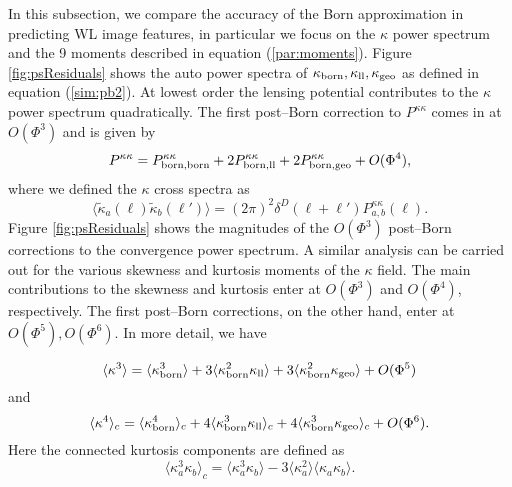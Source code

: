 \documentclass[reprint,aps,prd,superscriptaddress,showkeys,showpacs]{revtex4-1}
\begin{document}
In this subsection, we compare the accuracy of the Born approximation in predicting WL image features, in particular we focus on the $\kappa$ power spectrum and the 9 moments described in equation (\ref{par:moments}). Figure \ref{fig:psResiduals} shows the auto power spectra of $\kappa_{\rm born},\kappa_{\rm ll},\kappa_{\rm geo}$ as defined in equation (\ref{sim:pb2}). At lowest order the lensing potential contributes to the $\kappa$ power spectrum quadratically. The first post--Born correction to $P^{\kappa\kappa}$ comes in at $O(\Phi^3)$ and is given by
\begin{equation}
\label{res:powercorr}
P^{\kappa\kappa} = P^{\kappa\kappa}_{\rm born,born} + 2P^{\kappa\kappa}_{\rm born,ll} + 2P^{\kappa\kappa}_{\rm born,geo} + O(\Phi^4),
\end{equation}
%
where we defined the $\kappa$ cross spectra as
\begin{equation}
\label{res:powercross}
\langle\tilde{\kappa}_a(\pmb{\ell})\tilde{\kappa}_b(\pmb{\ell}')\rangle = (2\pi)^2\delta^D(\pmb{\ell}+\pmb{\ell}')P_{a,b}^{\kappa\kappa}(\ell).
\end{equation} 
%
Figure \ref{fig:psResiduals} shows the magnitudes of the $O(\Phi^3)$ post--Born corrections to the convergence power spectrum. A similar analysis can be carried out for the various skewness and kurtosis moments of the $\kappa$ field. The main contributions to the skewness and kurtosis enter at $O(\Phi^3)$ and $O(\Phi^4)$, respectively. The first post--Born corrections, on the other hand, enter at $O(\Phi^5),O(\Phi^6)$. In more detail, we have

\begin{equation}
\label{res:skewcross}
\langle\kappa^3\rangle = \langle\kappa_{\rm born}^3\rangle + 3\langle\kappa_{\rm born}^2\kappa_{\rm ll}\rangle + 3\langle\kappa_{\rm born}^2\kappa_{\rm geo}\rangle + O(\Phi^5)
\end{equation}
and
\begin{equation}
\label{res:kurtcross}
\langle\kappa^4\rangle_c = \langle\kappa_{\rm born}^4\rangle_c + 4\langle\kappa_{\rm born}^3\kappa_{\rm ll}\rangle_c + 4\langle\kappa_{\rm born}^3\kappa_{\rm geo}\rangle_c + O(\Phi^6).
\end{equation}
%
Here the connected kurtosis components are defined as 
\begin{equation}
\label{res:kurtconnected}
\langle\kappa^3_a\kappa_b\rangle_c = \langle\kappa^3_a\kappa_b\rangle - 3\langle\kappa_a^2\rangle\langle\kappa_a\kappa_b\rangle.
\end{equation}
\end{document}
